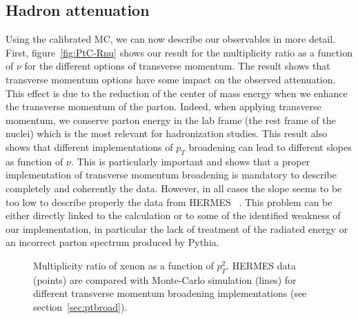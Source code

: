 \subsection{Hadron attenuation}

Using the calibrated MC, we can now describe our observables in more detail. 
First, figure~\ref{fig:PtC-Rnu} shows our result for the multiplicity 
ratio as a function of $\nu$ for the different options of transverse momentum. 
The result shows that transverse momentum options have some impact on the 
observed attenuation. This effect is due to the reduction of the center of mass 
energy when we enhance the transverse momentum of the parton. Indeed, when 
applying transverse momentum, we conserve parton energy in the lab frame (the 
rest frame of the nuclei) which is the most relevant for hadronization studies. 
This result also shows that different implementations of $p_T$ broadening can 
lead to different slopes as function of $\nu$. This is particularly important 
and shows that a proper implementation of transverse momentum broadening is 
mandatory to describe completely and coherently the data. However, in all 
cases the slope seems to be too low to describe properly the data from HERMES~%
\cite{Airapetian:2011jp}. This problem can be either directly linked to the 
calculation or to some of the identified weakness of our implementation, in 
particular the lack of treatment of the radiated energy or an incorrect parton 
spectrum produced by Pythia.

\begin{figure}[tbp]
  \centering
{}
\caption {Multiplicity ratio of xenon as a function of $p_T^2$. HERMES data~%
\cite{Airapetian:2011jp} (points) are compared with Monte-Carlo simulation 
(lines) for different transverse momentum broadening implementations (see 
section~\ref{sec:ptbroad}).}
\label{fig:PtC-RPts}
\end{figure}


